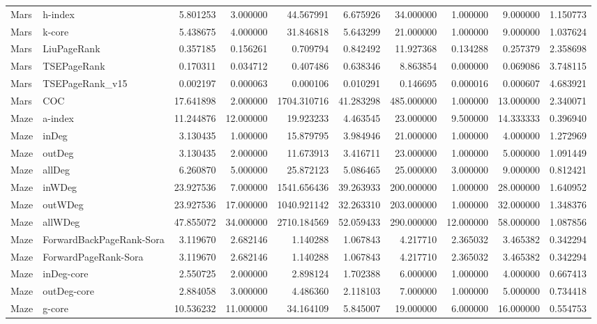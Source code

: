 \begin{tabular}{llrrrrrrrr}
Mars & h-index & 5.801253 & 3.000000 & 44.567991 & 6.675926 & 34.000000 & 1.000000 & 9.000000 & 1.150773 \\
Mars & k-core & 5.438675 & 4.000000 & 31.846818 & 5.643299 & 21.000000 & 1.000000 & 9.000000 & 1.037624 \\
Mars & LiuPageRank & 0.357185 & 0.156261 & 0.709794 & 0.842492 & 11.927368 & 0.134288 & 0.257379 & 2.358698 \\
Mars & TSEPageRank & 0.170311 & 0.034712 & 0.407486 & 0.638346 & 8.863854 & 0.000000 & 0.069086 & 3.748115 \\
Mars & TSEPageRank_v15 & 0.002197 & 0.000063 & 0.000106 & 0.010291 & 0.146695 & 0.000016 & 0.000607 & 4.683921 \\
Mars & COC & 17.641898 & 2.000000 & 1704.310716 & 41.283298 & 485.000000 & 1.000000 & 13.000000 & 2.340071 \\
Maze & a-index & 11.244876 & 12.000000 & 19.923233 & 4.463545 & 23.000000 & 9.500000 & 14.333333 & 0.396940 \\
Maze & inDeg & 3.130435 & 1.000000 & 15.879795 & 3.984946 & 21.000000 & 1.000000 & 4.000000 & 1.272969 \\
Maze & outDeg & 3.130435 & 2.000000 & 11.673913 & 3.416711 & 23.000000 & 1.000000 & 5.000000 & 1.091449 \\
Maze & allDeg & 6.260870 & 5.000000 & 25.872123 & 5.086465 & 25.000000 & 3.000000 & 9.000000 & 0.812421 \\
Maze & inWDeg & 23.927536 & 7.000000 & 1541.656436 & 39.263933 & 200.000000 & 1.000000 & 28.000000 & 1.640952 \\
Maze & outWDeg & 23.927536 & 17.000000 & 1040.921142 & 32.263310 & 203.000000 & 1.000000 & 32.000000 & 1.348376 \\
Maze & allWDeg & 47.855072 & 34.000000 & 2710.184569 & 52.059433 & 290.000000 & 12.000000 & 58.000000 & 1.087856 \\
Maze & ForwardBackPageRank-Sora & 3.119670 & 2.682146 & 1.140288 & 1.067843 & 4.217710 & 2.365032 & 3.465382 & 0.342294 \\
Maze & ForwardPageRank-Sora & 3.119670 & 2.682146 & 1.140288 & 1.067843 & 4.217710 & 2.365032 & 3.465382 & 0.342294 \\
Maze & inDeg-core & 2.550725 & 2.000000 & 2.898124 & 1.702388 & 6.000000 & 1.000000 & 4.000000 & 0.667413 \\
Maze & outDeg-core & 2.884058 & 3.000000 & 4.486360 & 2.118103 & 7.000000 & 1.000000 & 5.000000 & 0.734418 \\
Maze & g-core & 10.536232 & 11.000000 & 34.164109 & 5.845007 & 19.000000 & 6.000000 & 16.000000 & 0.554753 \\

\end{tabular}
